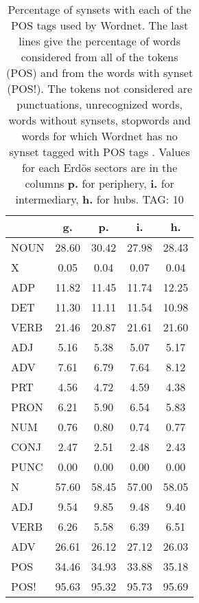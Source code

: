 \begin{table}[h!]
\begin{center}
\begin{tabular}{| l || c | c | c | c |}\hline
 & {\bf g.} & {\bf p.} & {\bf i.} & {\bf h.} \\\hline\hline
NOUN & 28.60  & 30.42  & 27.98  & 28.43 \\
X & 0.05  & 0.04  & 0.07  & 0.04 \\\hline
ADP & 11.82  & 11.45  & 11.74  & 12.25 \\
DET & 11.30  & 11.11  & 11.54  & 10.98 \\\hline
VERB & 21.46  & 20.87  & 21.61  & 21.60 \\\hline
ADJ & 5.16  & 5.38  & 5.07  & 5.17 \\
ADV & 7.61  & 6.79  & 7.64  & 8.12 \\\hline
PRT & 4.56  & 4.72  & 4.59  & 4.38 \\
PRON & 6.21  & 5.90  & 6.54  & 5.83 \\
NUM & 0.76  & 0.80  & 0.74  & 0.77 \\
CONJ & 2.47  & 2.51  & 2.48  & 2.43 \\
PUNC & 0.00  & 0.00  & 0.00  & 0.00 \\\hline\hline\hline
N & 57.60  & 58.45  & 57.00  & 58.05 \\\hline
ADJ & 9.54  & 9.85  & 9.48  & 9.40 \\\hline
VERB & 6.26  & 5.58  & 6.39  & 6.51 \\\hline
ADV & 26.61  & 26.12  & 27.12  & 26.03 \\\hline\hline
POS & 34.46  & 34.93  & 33.88  & 35.18 \\\hline
POS! & 95.63  & 95.32  & 95.73  & 95.69 \\\hline
\end{tabular}
\caption{Percentage of synsets with each of the POS tags used by Wordnet. The last lines give the percentage of words considered from all of the tokens (POS) and from the words with synset (POS!). The tokens not considered are punctuations, unrecognized words, words without synsets, stopwords and words for which Wordnet has no synset  tagged with POS tags . Values for each Erd\"os sectors are in the columns {{\bf p.}} for periphery, {{\bf i.}} for intermediary, {{\bf h.}} for hubs. TAG: 10}
\end{center}
\end{table}
